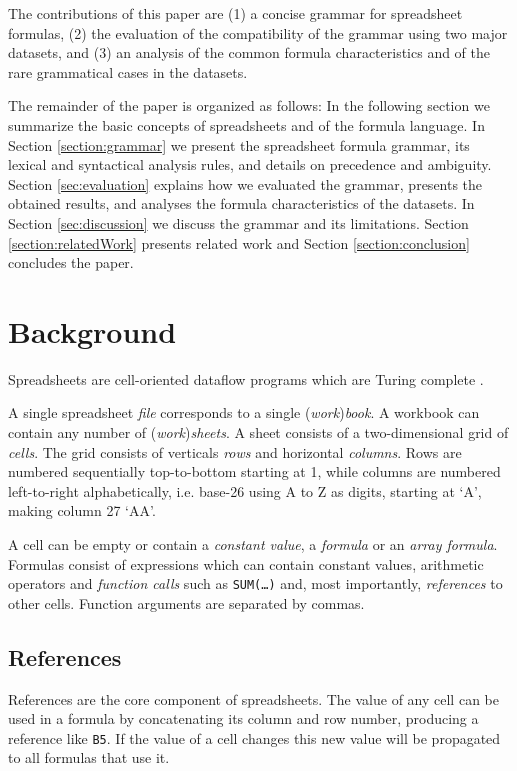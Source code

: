 \documentclass[conference]{IEEEtran}
\begin{document}
The contributions of this paper are (1) a concise grammar for spreadsheet formulas, (2) the evaluation of the compatibility of the grammar using two major datasets, and (3) an analysis of the common formula characteristics and of the rare grammatical cases in the datasets.

The remainder of the paper is organized as follows: In the following section we summarize the basic concepts of spreadsheets and of the formula language. In Section \ref{section:grammar} we present the spreadsheet formula grammar, its lexical and syntactical analysis rules, and details on precedence and ambiguity. Section \ref{sec:evaluation} explains how we evaluated the grammar, presents the obtained results, and analyses the formula characteristics of the datasets. In Section \ref{sec:discussion} we discuss the grammar and its limitations. Section \ref{section:relatedWork} presents related work and Section \ref{section:conclusion} concludes the paper.

\section{Background}

Spreadsheets are cell-oriented dataflow programs which are Turing complete \cite{ExcelTuringComplete}.

A single spreadsheet \emph{file} corresponds to a single (\emph{work})\emph{book}.
A workbook can contain any number of (\emph{work})\emph{sheets}.
A sheet consists of a two-dimensional grid of \emph{cells}.
The grid consists of verticals \emph{rows} and horizontal \emph{columns}.
Rows are numbered sequentially top-to-bottom starting at 1, while columns are numbered left-to-right alphabetically, i.e. base-26 using A to Z as digits, starting at `A', making column 27 `AA'.

A cell can be empty or contain a \emph{constant value}, a \emph{formula} or an \emph{array formula}.
Formulas consist of expressions which can contain constant values, arithmetic operators and \emph{function calls} such as \texttt{SUM(\ldots)} and, most importantly, \emph{references} to other cells.
Function arguments are separated by commas.

\subsection{References}
References are the core component of spreadsheets.
The value of any cell can be used in a formula by concatenating its column and row number, producing a reference like \texttt{B5}.
If the value of a cell changes this new value will be propagated to all formulas that use it.
\end{document}
